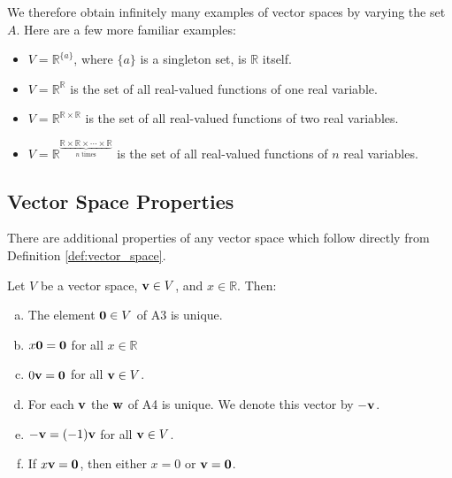 \documentclass[12pt,letterpaper,reqno]{article}
\numberwithin{equation}{section}
\begin{document}
We therefore obtain infinitely many examples of vector spaces by varying the set $A$. Here are a few more familiar examples:

\begin{itemize}
	\item $V=\mathbb{R}^{\{a\}}$, where $\{a\}$ is a singleton set, is $\mathbb{R}$ itself.
	\item $V=\mathbb{R}^{\mathbb{R}}$ is the set of all real-valued functions of one real variable.
	\item $V=\mathbb{R}^{\mathbb{R} \times \mathbb{R}}$ is the set of all real-valued functions of two real variables.
	\item $V=\mathbb{R}^{\underbrace{\mathbb{R} \times \mathbb{R} \times \cdots \times \mathbb{R}}_{\text{$n$ times}}}$ is the set of all real-valued functions of $n$ real variables.
\end{itemize}


\subsection{Vector Space Properties}
There are additional properties of any vector space which follow directly from Definition \ref{def:vector_space}.

\begin{thm}\label{thm:properties_of_vector_spaces}
	Let $V$ be a vector space, ${\bf v} \in V$, and $x \in \mathbb{R}$. Then:
	\begin{enumerate}[(a)]
		\item The element ${\bf 0} \in V$ of A3 is unique.
		\item $x{\bf 0}={\bf 0}$ for all $x\in \mathbb{R}$ 
		\item $0{\bf v}={\bf 0}$ for all ${\bf v} \in V$.
		\item For each ${\bf v}$ the ${\bf w}$ of A4 is unique. We denote this vector by $-{\bf v}$.
		\item $-{\bf v}=(-1){\bf v}$ for all ${\bf v} \in  V$.
		\item If $x{\bf v}={\bf 0}$, then either $x=0$ or ${\bf v}={\bf 0}$.
	\end{enumerate}
\end{thm}
\end{document}

